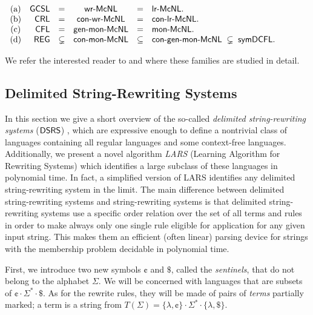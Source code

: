 \begin{theorem}{\rm \cite{Beaudry2003,Leupold2011}}\label{ThmMcNL}\\[+0.2cm]
$\begin{array}[t]{crcccl}
{\rm (a)} & \GCSL & = & \wrMcNL & = & \lrMcNL.\\
{\rm (b)} & \CRL  & = & \conwrMcNL & = & \conlrMcNL.\\
{\rm (c)} & \CFL  & = & \mbox{\sf gen-mon-McNL} & = & \mbox{\sf mon-McNL}.\\
{\rm (d)} & \REG  & \subsetneq & \mbox{\sf con-mon-McNL} & \subseteq & 
\mbox{\sf con-gen-mon-McNL}\; \subsetneq\; \symDCFL.
\end{array}$
\end{theorem}

We refer the interested reader 
to \cite{Beaudry2003} and \cite{Leupold2011} where these families are studied in detail. 

\subsection{Delimited String-Rewriting Systems}
\label{section:delimited-string-rewriting-systems}

In this section we give a short overview of the so-called \emph{delimited string-rewriting systems} ($\mbox{\sf DSRS}$) \cite{Eyraud2007}, which are expressive enough to define a nontrivial class of languages containing all regular languages and some context-free languages. Additionally, we present a novel algorithm \emph{LARS} \cite{Eyraud2007} (Learning Algorithm for Rewriting Systems) which identifies a large subclass of these languages in polynomial time. In fact, a simplified version of LARS \cite{delaHiguera2010} identifies any delimited string-rewriting system in the limit. The main difference between delimited string-rewriting systems and string-rewriting systems is that delimited string-rewriting systems use a specific order relation over the set of all terms and rules in order to make always only one single rule eligible for application for any given input string. This makes them an efficient (often linear) parsing device for strings with the membership problem decidable in polynomial time.

First, we introduce two new symbols $\cent$ and $\$$, called the \emph{sentinels}, that do not belong to the alphabet $\Sigma$. We will be concerned with languages that are subsets of $\cent \cdot \Sigma^* \cdot \$$. As for the rewrite rules, they will be made of pairs of \emph{terms} partially marked; a term is a string from $T(\Sigma) = \{\lambda, \cent\} \cdot \Sigma^* \cdot \{\lambda, \$\}$.

